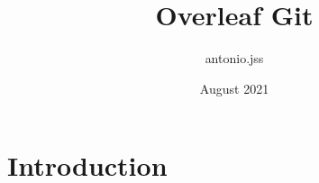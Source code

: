 \documentclass{article}
\title{Overleaf Git}
\author{antonio.jss }
\date{August 2021}
\begin{document}
\maketitle

\section{Introduction}
\end{document}
